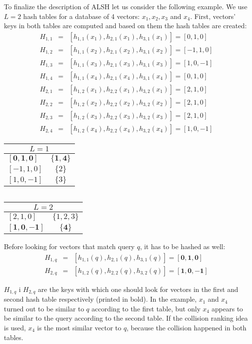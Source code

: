 To finalize the description of ALSH let us consider the following example.
We use $L = 2$ hash tables for a database of 4 vectors:
$x_1, x_2, x_3$ and $x_4$. 
First, vectors' keys in both tables are computed and based on them the hash tables are created:
\begin{eqnarray*}
H_{1,1} & = & [h_{1,1}(x_1), h_{2,1}(x_1), h_{3,1}(x_1)] = [0, 1, 0]\\
H_{1,2} & = &  [h_{1,1}(x_2), h_{2,1}(x_2), h_{3,1}(x_2)] = [-1, 1, 0]\\
H_{1,3} & = &  [h_{1,1}(x_3), h_{2,1}(x_3), h_{3,1}(x_3)] = [1, 0, -1]\\
H_{1,4} & = &  [h_{1,1}(x_4), h_{2,1}(x_4), h_{3,1}(x_4)] = [0, 1, 0]\\
H_{2,1} & = &  [h_{1,2}(x_1), h_{2,2}(x_1), h_{3,2}(x_1)] = [2, 1, 0]\\
H_{2,2} & = &  [h_{1,2}(x_2), h_{2,2}(x_2), h_{3,2}(x_2)] = [2, 1, 0]\\
H_{2,3} & = &  [h_{1,2}(x_3), h_{2,2}(x_3), h_{3,2}(x_3)] = [2, 1, 0]\\
H_{2,4} & = &  [h_{1,2}(x_4), h_{2,2}(x_4), h_{3,2}(x_4)] = [1, 0, -1]
\end{eqnarray*}
\renewcommand{\arraystretch}{1.2}
\begin{center}
\begin{tabular}{|l|c|}
\hline
\multicolumn{2}{|c|}{$L = 1$} \\
\hline
$\bm{[0, 1, 0]}$ & $\bm{\{1, 4\}}$ \\
\hline
$[-1, 1, 0]$ & $\{2\}$ \\
\hline
$[1, 0, -1]$ & $\{3\}$ \\
\hline
\end{tabular}
$\ \ \ \ $
\begin{tabular}{|l|c|}
\hline
\multicolumn{2}{|c|}{$L = 2$} \\
\hline
$[2, 1, 0]$ & $\{1, 2, 3\}$ \\
\hline
$\bm{[1, 0, -1]}$ & $\bm{\{4\}}$ \\
\hline
\end{tabular}
\end{center}

Before looking for vectors that match query $q$, it has to be hashed as well:
\begin{eqnarray*}
H_{1,q} & = & [h_{1,1}(q), h_{2,1}(q), h_{3,1}(q)] = \bm{[0, 1, 0]} \\
H_{2,q} & = & [h_{1,2}(q), h_{2,2}(q), h_{3,2}(q)] = \bm{[1, 0, -1]} 
\end{eqnarray*}

$H_{1,q}$ i $H_{2,q}$ are the keys with which one should look for vectors in the first and second hash table respectively (printed in bold).
In the example, $x_1$ and $x_4$ turned out to be similar to $q$ according to the first table, but only $x_4$ appears to be similar to the query according to the second table.
If the collision ranking idea is used, $x_4$ is the most similar vector to $q$, because the collision happened in both tables.
